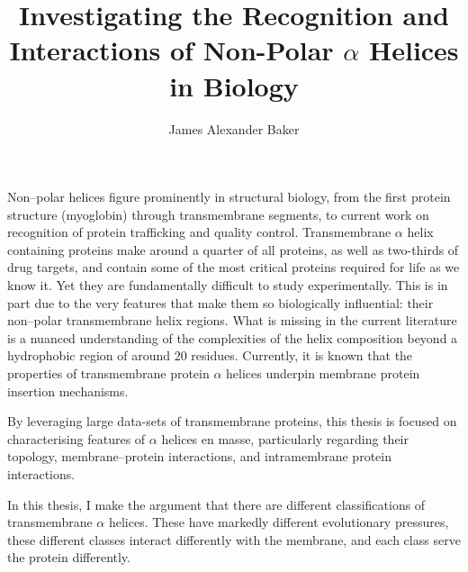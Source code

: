 \documentclass[12pt,PhD,twoside]{muthesis}
\begin{document}
\sloppy

\title{Investigating the Recognition and Interactions of Non-Polar \(\alpha\) Helices in Biology}
\author{James Alexander Baker}
\def\wordcount{22,000}






\beforeabstract{} %


Non\---polar helices figure prominently in structural biology, from the first protein structure (myoglobin) through transmembrane segments, to current work on recognition of protein trafficking and quality control.
Transmembrane \(\alpha\) helix containing proteins make around a quarter of all proteins, as well as two-thirds of drug targets, and contain some of the most critical proteins required for life as we know it.
Yet they are fundamentally difficult to study experimentally. This is in part due to the very features that make them so biologically influential: their non\---polar transmembrane helix regions.
What is missing in the current literature is a nuanced understanding of the complexities of the helix composition beyond a hydrophobic region of around 20 residues.
Currently, it is known that the properties of transmembrane protein \(\alpha\) helices underpin membrane protein insertion mechanisms.

By leveraging large data-sets of transmembrane proteins, this thesis is focused on characterising features of \(\alpha\) helices en masse, particularly regarding their topology, membrane\---protein interactions, and intramembrane protein interactions.

In this thesis, I make the argument that there are different classifications of transmembrane \(\alpha\) helices. These have markedly different evolutionary pressures, these different classes interact differently with the membrane, and each class serve the protein differently.

\end{document}
